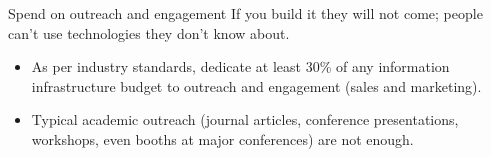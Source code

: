 \begin{frame}{Spend on outreach and engagement}
  If you build it they will not come; people can't use technologies they don't know about.
      \begin{itemize}
        \item As per industry standards, dedicate at least 30\% of any information infrastructure budget to outreach and engagement (sales and marketing). 
        \item Typical academic outreach (journal articles, conference presentations, workshops, even booths at major conferences) are not enough.
    \end{itemize}
\end{frame}